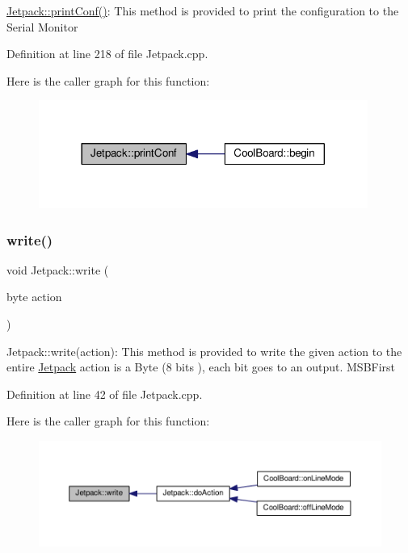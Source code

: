 \hyperlink{class_jetpack_ac54a7bb4f9166bee32052253d9b1d306}{Jetpack\+::print\+Conf()}\+: This method is provided to print the configuration to the Serial Monitor 

Definition at line 218 of file Jetpack.\+cpp.

Here is the caller graph for this function\+:
\nopagebreak
\begin{figure}[H]
\begin{center}
\leavevmode
\includegraphics[width=305pt]{df/d1d/class_jetpack_ac54a7bb4f9166bee32052253d9b1d306_icgraph}
\end{center}
\end{figure}
\mbox{\label{class_jetpack_a338f1af8cbc6504ac69b47c7328569b5}} 
\subsubsection{\texorpdfstring{write()}{write()}}
{\footnotesize\ttfamily void Jetpack\+::write (\begin{DoxyParamCaption}\item[{byte}]{action }\end{DoxyParamCaption})}

Jetpack\+::write(action)\+: This method is provided to write the given action to the entire \hyperlink{class_jetpack}{Jetpack} action is a Byte (8 bits ), each bit goes to an output. M\+S\+B\+First 

Definition at line 42 of file Jetpack.\+cpp.

Here is the caller graph for this function\+:
\nopagebreak
\begin{figure}[H]
\begin{center}
\leavevmode
\includegraphics[width=350pt]{df/d1d/class_jetpack_a338f1af8cbc6504ac69b47c7328569b5_icgraph}
\end{center}
\end{figure}
\mbox{\label{class_jetpack_a79ae7bc3c1828a0551a7c005c4f8bd00}} 
